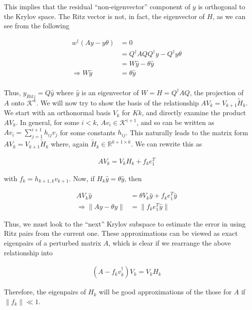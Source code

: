 \documentclass[11pt]{article}
\newcommand{\K}[1]{\mathcal{K}^{#1}}
\newcommand{\Rmn}[2]{\mathbb{R}^{#1 \times #2}}
\begin{document}
This implies that the residual ``non-eigenvector'' component of $y$ is orthogonal to the Krylov space. The Ritz vector is not, in fact, the eigenvector of $H$, as we can see from the following

\begin{align*}
  w^\dagger(Ay - y \theta) &= 0 \\
  &= Q^\dagger A Q Q^\dagger y - Q^\dagger y \theta \\
  &= W \hat{y} - \theta \hat{y} \\
  \Rightarrow W \hat{y} &= \theta \hat{y} \\
\end{align*}

Thus, $y_{Ritz} = Q \hat{y}$ where $\hat{y}$ is an eigenvector of $W = H = Q^\dagger A Q$, the projection of $A$ onto $\K{k}$. We will now try to show the basis of the relationship $AV_k = V_{k+1} \tilde{H}_k$. \\

We start with an orthonormal basis $V_k$ for $K{k}$, and directly examine the product $A V_k$. In general, for some $i < k$, $A v_i \in \K{i+1}$, and so can be written as $A v_i = \sum \limits_{j = 1}^{i+1} h_{ij} v_j$ for some constants $h_{ij}$. This naturally leads to the matrix form $A V_k = V_{k+1} \tilde{H}_k$ where, again $\tilde{H}_k \in \Rmn{k+1}{k}$. We can rewrite this as

\begin{align*}
  A V_k = V_k H_k + f_k e_1^T
\end{align*}

with $f_k = h_{k+1, k} v_{k+1}$. Now, if $H_k \hat{y} = \theta \hat{y}$, then 

\begin{align*}
  A V_k \hat{y} &= \theta V_k \hat{y} + f_k e_1^T  \hat{y} \\
  \Rightarrow \| A y - \theta y \| &=  \| f_k e_1^T \hat{y} \|
\end{align*}

Thus, we must look to the ``next'' Krylov subspace to estimate the error in using Ritz pairs from the current one. These approximations can be viewed as exact eigenpairs of a perturbed matrix $A$, which is clear if we rearrange the above relationship into

\begin{align*}
  (A - f_k v_k^\dagger) V_k = V_k H_k
\end{align*}

Therefore, the eigenpairs of $H_k$ will be good approximations of the those for $A$ if $\| f_k \| \ll 1$.
\end{document}

